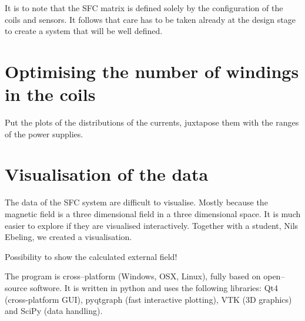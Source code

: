 It is to note that the SFC matrix is defined solely by the configuration of the coils and sensors. It follows that care has to be taken already at the design stage to create a system that will be well defined.


\section{Optimising the number of windings in the coils}
Put the plots of the distributions of the currents, juxtapose them with the
ranges of the power supplies.


\section{Visualisation of the data}
The data of the SFC system are difficult to visualise. Mostly because the magnetic field is a three dimensional field in a three dimensional space. It is much easier to explore if they are visualised interactively. Together with a student, Nils Ebeling, we created a visualisation.

Possibility to show the calculated external field!

The program is cross--platform (Windows, OSX, Linux), fully based on open--source softwore. It is written in python and uses the following libraries: Qt4 (cross-platform GUI), pyqtgraph (fast interactive plotting), VTK (3D graphics) and SciPy (data handling).

